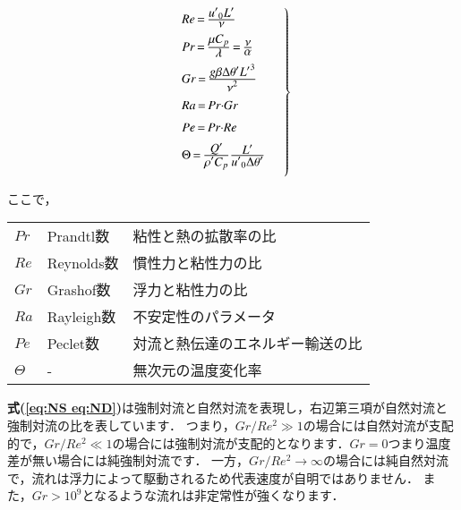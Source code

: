 \begin{equation}
\left.{\begin{array}{l}
\vspace{2mm}
{{Re}\,{=}\,\frac{\displaystyle {{u}'}_{0}{L}'}{\displaystyle \mathrm{\nu}}}\\
\vspace{2mm}
{{Pr}\,{=}\,\frac{\displaystyle \mathrm{\mu}{C}_{p}}{\displaystyle \mathrm{\lambda}}\,{=}\,\frac{\displaystyle \mathrm{\nu}}{\displaystyle \mathrm{\alpha}}}\\
\vspace{2mm}
{{Gr}\,{=}\,\frac{\displaystyle {g}\mathrm{\beta}\mathrm{\Delta}{\mathrm{\theta}}'{{L}'}^{3}}{\displaystyle {\mathrm{\nu}}^{2}}}\\
\vspace{2mm}
{{Ra}\,{=}\,{Pr}\mathrm{\cdot}{Gr}}\\
\vspace{2mm}
{{Pe}\,{=}\,{Pr}\mathrm{\cdot}{Re}}\\
\vspace{2mm}
{\mathrm{\Theta}\,{=}\,\frac{\displaystyle Q^{\prime}}{\displaystyle {\mathrm{\rho}}'{C}_{p}}\frac{\displaystyle {L}'}{\displaystyle {{u}'}_{0}\mathrm{\Delta}{\mathrm{\theta}}'}}
\end{array}\quad }\right\}
\label{eq:ND definition}
\end{equation}

\noindent ここで，
\vspace{1.0cm}
\begin{center}
\begin{tabular}{lll}
$Pr$ & Prandtl数 & 粘性と熱の拡散率の比\\
$Re$ & Reynolds数 & 慣性力と粘性力の比\\
$Gr$ & Grashof数 & 浮力と粘性力の比\\
$Ra$ & Rayleigh数 & 不安定性のパラメータ\\
$Pe$ & Peclet数 & 対流と熱伝達のエネルギー輸送の比\\
$\Theta$ & - & 無次元の温度変化率\\
\end{tabular}
\end{center}
\vspace{1.0cm}

\noindent \textbf{式(\ref{eq:NS eq:ND})}は強制対流と自然対流を表現し，右辺第三項が自然対流と強制対流の比を表しています．
つまり，$Gr/Re^2 \gg 1$の場合には自然対流が支配的で，$Gr/Re^2 \ll 1$の場合には強制対流が支配的となります．$Gr = 0$つまり温度差が無い場合には純強制対流です．
一方，$Gr/Re^2 \rightarrow \infty$の場合には純自然対流で，流れは浮力によって駆動されるため代表速度が自明ではありません．
また，$Gr > 10^9$となるような流れは非定常性が強くなります．

